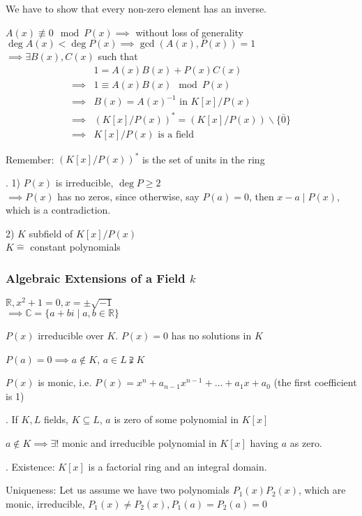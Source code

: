 We have to show that every non-zero element has an inverse.

$A(x) \not\equiv 0 \mod P(x) \implies $ without loss of generality $\deg A(x) < \deg P(x) \implies \gcd(A(x), P(x)) = 1$\\
$\implies \exists B(x), C(x)$ such that
\begin{align*}
  & 1 = A(x)B(x) + P(x)C(x)\\
  \implies & 1 \equiv A(x) B(x) \mod P(x) \\
  \implies & B(x) = A(x)^{-1} \text{ in } K[x] / P(x) \\
  \implies & (K[x] / P(x))^{*} = (K[x]/P(x)) \backslash \{\bar{0}\} \\
  \implies & K[x] / P(x) \text{ is a field}
\end{align*}

Remember: $(K[x] / P(x))^{*}$ is the set of units in the ring

\Remark.
1) $P(x)$ is irreducible, $\deg P \geq 2$ \\
$\implies P(x)$ has no zeros, since otherwise, say $P(a) = 0$, then $x - a ∣ P(x)$, which is a contradiction.

2) $K$ subfield of $K[x]/P(x)$\\
$K\hat{=}$ constant polynomials

\subsubsection{Algebraic Extensions of a Field $k$}
$\mathbb{R}, x^2 +1 = 0, x = \pm \sqrt{-1}$ \\
$\implies \mathbb{C} = \{a+bi \mid a,b \in \mathbb{R} \}$

$P(x)$ irreducible over $K$. $P(x) = 0$ has no solutions in $K$

$P(a) = 0 \implies a\notin K$, $ a \in L \supsetneqq K$

$P(x)$ is monic, i.e. $P(x) = x^n + a_{n-1}x^{n-1} + \ldots + a_1 x + a_0$ (the first coefficient is 1)

\Theorem.
If $K,L$ fields, $K\subseteq L$, $a$ is zero of some polynomial in $K[x]$

$a \notin K \implies \exists!$ monic and irreducible polynomial in $K[x]$ having $a$ as zero.

\Proof.
Existence: $K[x]$ is a factorial ring and an integral domain.

Uniqueness: Let us assume we have two polynomials $P_1(x) P_2(x)$, which are monic, irreducible, $P_1(x) \neq P_2(x), P_1(a) = P_2(a) = 0$

